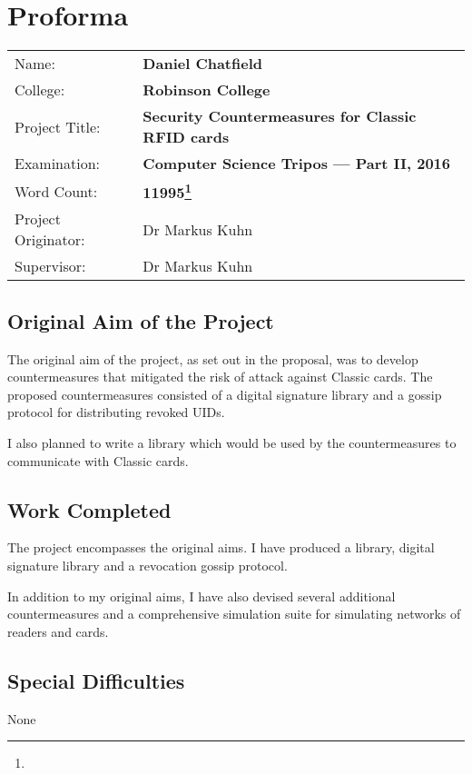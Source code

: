 \documentclass[final,dissertation.tex]{subfiles}
\begin{document}
  \chapter*{Proforma}

  {\large
  \begin{table}[h]
  \begin{tabularx}{\textwidth}{ll}
  Name:               & \bf Daniel Chatfield                      \\
  College:            & \bf Robinson College                      \\
  Project Title:      & \bf Security Countermeasures for \mifare{} Classic RFID cards \\
  Examination:        & \bf Computer Science Tripos --- Part II, 2016  \\
  Word Count:         & \bf \SI{11995}{}\footnote{}  \\
  Project Originator: & Dr Markus Kuhn                    \\
  Supervisor:         & Dr Markus Kuhn                    \\
  \end{tabularx}
  \end{table}
  }


  \section*{Original Aim of the Project}

  The original aim of the project, as set out in the proposal, was to develop countermeasures that mitigated the risk of attack against \mifare{} Classic cards. The proposed countermeasures consisted of a digital signature library and a gossip protocol for distributing revoked UIDs.

  I also planned to write a \mifare{} library which would be used by the countermeasures to communicate with \mifare{} Classic cards.

  \section*{Work Completed}

  The project encompasses the original aims. I have produced a \mifare{} library, digital signature library and a revocation gossip protocol.

  In addition to my original aims, I have also devised several additional countermeasures and a comprehensive simulation suite for simulating networks of readers and cards.

  \section*{Special Difficulties}
  None
\end{document}
